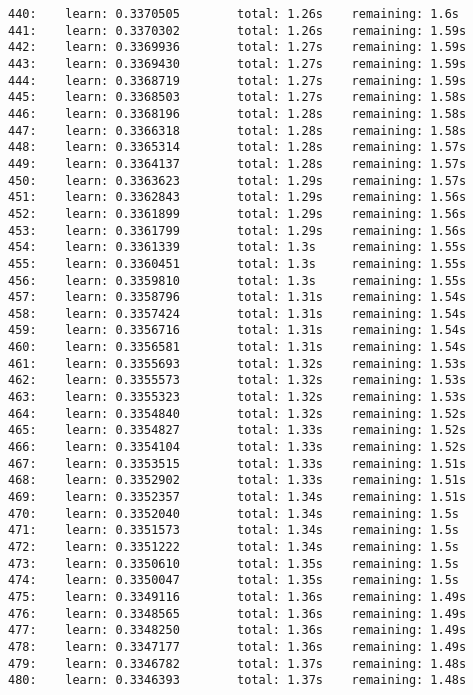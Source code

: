 \documentclass[11pt]{article}
\begin{document}
\begin{Verbatim}[commandchars=\\\{\}]
440:    learn: 0.3370505        total: 1.26s    remaining: 1.6s
441:    learn: 0.3370302        total: 1.26s    remaining: 1.59s
442:    learn: 0.3369936        total: 1.27s    remaining: 1.59s
443:    learn: 0.3369430        total: 1.27s    remaining: 1.59s
444:    learn: 0.3368719        total: 1.27s    remaining: 1.59s
445:    learn: 0.3368503        total: 1.27s    remaining: 1.58s
446:    learn: 0.3368196        total: 1.28s    remaining: 1.58s
447:    learn: 0.3366318        total: 1.28s    remaining: 1.58s
448:    learn: 0.3365314        total: 1.28s    remaining: 1.57s
449:    learn: 0.3364137        total: 1.28s    remaining: 1.57s
450:    learn: 0.3363623        total: 1.29s    remaining: 1.57s
451:    learn: 0.3362843        total: 1.29s    remaining: 1.56s
452:    learn: 0.3361899        total: 1.29s    remaining: 1.56s
453:    learn: 0.3361799        total: 1.29s    remaining: 1.56s
454:    learn: 0.3361339        total: 1.3s     remaining: 1.55s
455:    learn: 0.3360451        total: 1.3s     remaining: 1.55s
456:    learn: 0.3359810        total: 1.3s     remaining: 1.55s
457:    learn: 0.3358796        total: 1.31s    remaining: 1.54s
458:    learn: 0.3357424        total: 1.31s    remaining: 1.54s
459:    learn: 0.3356716        total: 1.31s    remaining: 1.54s
460:    learn: 0.3356581        total: 1.31s    remaining: 1.54s
461:    learn: 0.3355693        total: 1.32s    remaining: 1.53s
462:    learn: 0.3355573        total: 1.32s    remaining: 1.53s
463:    learn: 0.3355323        total: 1.32s    remaining: 1.53s
464:    learn: 0.3354840        total: 1.32s    remaining: 1.52s
465:    learn: 0.3354827        total: 1.33s    remaining: 1.52s
466:    learn: 0.3354104        total: 1.33s    remaining: 1.52s
467:    learn: 0.3353515        total: 1.33s    remaining: 1.51s
468:    learn: 0.3352902        total: 1.33s    remaining: 1.51s
469:    learn: 0.3352357        total: 1.34s    remaining: 1.51s
470:    learn: 0.3352040        total: 1.34s    remaining: 1.5s
471:    learn: 0.3351573        total: 1.34s    remaining: 1.5s
472:    learn: 0.3351222        total: 1.34s    remaining: 1.5s
473:    learn: 0.3350610        total: 1.35s    remaining: 1.5s
474:    learn: 0.3350047        total: 1.35s    remaining: 1.5s
475:    learn: 0.3349116        total: 1.36s    remaining: 1.49s
476:    learn: 0.3348565        total: 1.36s    remaining: 1.49s
477:    learn: 0.3348250        total: 1.36s    remaining: 1.49s
478:    learn: 0.3347177        total: 1.36s    remaining: 1.49s
479:    learn: 0.3346782        total: 1.37s    remaining: 1.48s
480:    learn: 0.3346393        total: 1.37s    remaining: 1.48s

\end{Verbatim}
\end{document}
